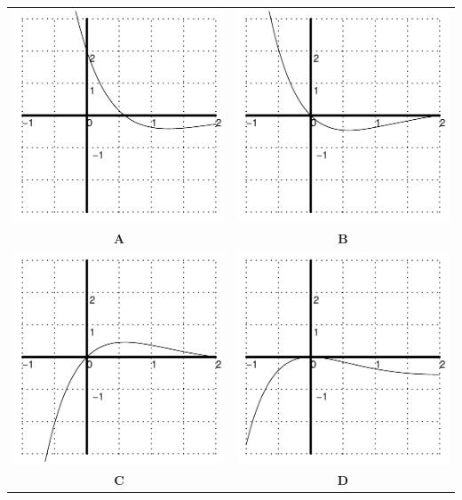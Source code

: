 \begin{minipage}[h]{0.65\linewidth}
\begin{center}
\begin{tabular}{cc}
\includegraphics[width=2.5in]{graphics/notes_01_f_and_deriv_graph_c} &
\includegraphics[width=2.5in]{graphics/notes_01_f_and_deriv_graph_b} \\
{\bf A} &  {\bf B} \\ \hline
\includegraphics[width=2.5in]{graphics/notes_01_f_and_deriv_graph_a} &
\includegraphics[width=2.5in]{graphics/notes_01_f_and_deriv_graph_d} \\
{\bf C} &  {\bf D} 
\end{tabular}
\end{center}
\end{minipage}

